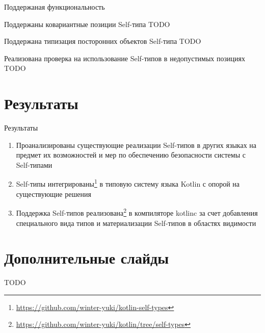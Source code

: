 \documentclass[usenames, dvipsnames]{beamer}
\begin{document}
    \begin{frame}{Поддержаная функциональность}
        \begin{block}{Поддержаны ковариантные позиции Self-типа}
            TODO %
        \end{block}
        \begin{block}{Поддержана типизация посторонних объектов Self-типа}
            TODO %
        \end{block}
        \begin{block}{Реализована проверка на использование Self-типов в недопустимых позициях}
            TODO %
        \end{block}
    \end{frame}


    \section{Результаты}

    \begin{frame}{Результаты}
        \begin{enumerate}
            \item Проанализированы существующие реализации Self-типов в других языках на предмет их возможностей и мер по обеспечению безопасности системы с Self-типами
            \item Self-типы интегрированы\footnote{\url{https://github.com/winter-yuki/kotlin-self-types}} в типовую систему языка Kotlin с опорой на существующие решения
            \item Поддержка Self-типов реализована\footnote{\url{https://github.com/winter-yuki/kotlin/tree/self-types}} в компиляторе kotlinc за счет добавления специального вида типов и материализации Self-типов в областях видимости
        \end{enumerate}
    \end{frame}


    \appendix


    \section{Дополнительные слайды}

    \begin{frame}{}
        TODO %
    \end{frame}
\end{document}
